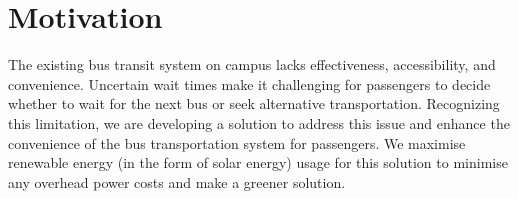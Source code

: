 
\section{Motivation}

The existing bus transit system on campus lacks effectiveness, accessibility, and convenience. Uncertain wait times make it challenging for passengers to decide whether to wait for the next bus or seek alternative transportation. Recognizing this limitation, we are developing a solution to address this issue and enhance the convenience of the bus transportation system for passengers. We maximise renewable energy (in the form of solar energy) usage for this solution to minimise any overhead power costs and make a greener solution.
